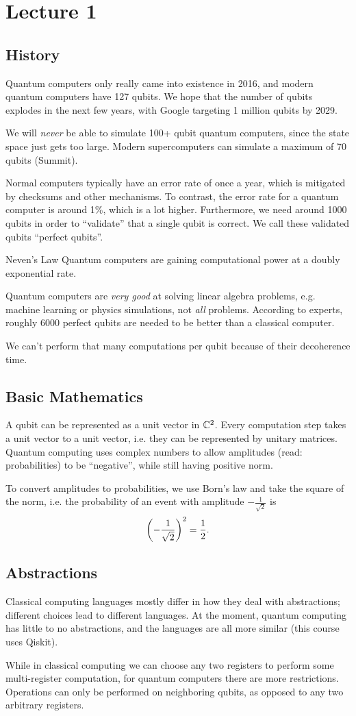\documentclass[class=article, crop=false]{standalone}
\begin{document}
  \section{Lecture 1}
  \subsection{History}
  Quantum computers only really came into existence in 2016, and modern quantum computers have 127 qubits. We hope that the number of qubits explodes in the next few years, with Google targeting 1 million qubits by 2029. \par
  We will \emph{never} be able to simulate 100+ qubit quantum computers, since the state space just gets too large. Modern supercomputers can simulate a maximum of 70 qubits (Summit). \par
  Normal computers typically have an error rate of once a year, which is mitigated by checksums and other mechanisms. To contrast, the error rate for a quantum computer is around 1\%, which is a lot higher. Furthermore, we need around 1000 qubits in order to ``validate'' that a single qubit is correct. We call these validated qubits ``perfect qubits''.
  \begin{definition}{Neven's Law}
    Quantum computers are gaining computational power at a doubly exponential rate.
  \end{definition}
  Quantum computers are \emph{very good} at solving linear algebra problems, e.g. machine learning or physics simulations, not \emph{all} problems. According to experts, roughly 6000 perfect qubits are needed to be better than a classical computer. \par
  We can't perform that many computations per qubit because of their decoherence time.
  \subsection{Basic Mathematics}
  A qubit can be represented as a unit vector in $\mathbb{C}^2$. Every computation step takes a unit vector to a unit vector, i.e. they can be represented by unitary matrices. Quantum computing uses complex numbers to allow amplitudes (read: probabilities) to be ``negative'', while still having positive norm. \par
  To convert amplitudes to probabilities, we use Born's law and take the square of the norm, i.e. the probability of an event with amplitude $-\frac{1}{\sqrt{2}}$ is
  \[
    \left( -\frac{1}{\sqrt{2}} \right)^2 = \frac{1}{2}.
  \]
  \subsection{Abstractions}
  Classical computing languages mostly differ in how they deal with abstractions; different choices lead to different languages. At the moment, quantum computing has little to no abstractions, and the languages are all more similar (this course uses Qiskit). \par
  While in classical computing we can choose any two registers to perform some multi-register computation, for quantum computers there are more restrictions. Operations can only be performed on neighboring qubits, as opposed to any two arbitrary registers.
\end{document}
